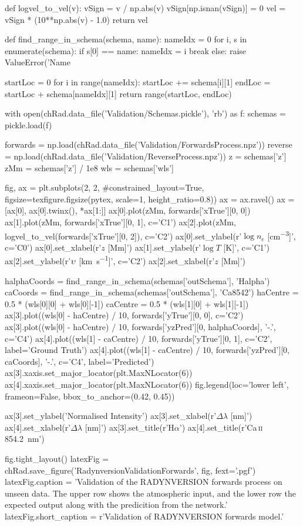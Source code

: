 \begin{pycode}[Radynversion]
def logvel_to_vel(v):
    vSign = v / np.abs(v)
    vSign[np.isnan(vSign)] = 0
    vel = vSign * (10**np.abs(v) - 1.0)
    return vel

def find_range_in_schema(schema, name):
    nameIdx = 0
    for i, s in enumerate(schema):
        if s[0] == name:
            nameIdx = i
            break
    else:
        raise ValueError('Name %

    startLoc = 0
    for i in range(nameIdx):
        startLoc += schema[i][1]
    endLoc = startLoc + schema[nameIdx][1]
    return range(startLoc, endLoc)

with open(chRad.data_file('Validation/Schemas.pickle'), 'rb') as f:
    schemas = pickle.load(f)

forwards = np.load(chRad.data_file('Validation/ForwardsProcess.npz'))
reverse = np.load(chRad.data_file('Validation/ReverseProcess.npz'))
z = schemas['z']
zMm = schemas['z'] / 1e8
wls = schemas['wls']

fig, ax = plt.subplots(2, 2, #constrained_layout=True,
                       figsize=texfigure.figsize(pytex, scale=1, height_ratio=0.8))
ax = ax.ravel()
ax = [ax[0], ax[0].twinx(), *ax[1:]]
ax[0].plot(zMm, forwards['xTrue'][0, 0])
ax[1].plot(zMm, forwards['xTrue'][0, 1], c='C1')
ax[2].plot(zMm, logvel_to_vel(forwards['xTrue'][0, 2]), c='C2')
ax[0].set_ylabel(r'$\log{n_e}$ [\si{\cm\tothe{-3}}]', c='C0')
ax[0].set_xlabel(r'$z$ [\si{\mega\metre}]')
ax[1].set_ylabel(r'$\log{T}$ [\si{\K}]', c='C1')
ax[2].set_ylabel(r'$\upsilon$ [\si{\kilo\metre\per\second}]', c='C2')
ax[2].set_xlabel(r'$z$ [\si{\mega\metre}]')


halphaCoords = find_range_in_schema(schemas['outSchema'], 'Halpha')
caCoords = find_range_in_schema(schemas['outSchema'], 'Ca8542')
haCentre = 0.5 * (wls[0][0] + wls[0][-1])
caCentre = 0.5 * (wls[1][0] + wls[1][-1])
ax[3].plot((wls[0] - haCentre) / 10, forwards['yTrue'][0, 0], c='C2')
ax[3].plot((wls[0] - haCentre) / 10, forwards['yzPred'][0, halphaCoords], '-.', c='C4')
ax[4].plot((wls[1] - caCentre) / 10, forwards['yTrue'][0, 1], c='C2', label='Ground Truth')
ax[4].plot((wls[1] - caCentre) / 10, forwards['yzPred'][0, caCoords], '-.', c='C4', label='Predicted')
ax[3].xaxis.set_major_locator(plt.MaxNLocator(6))
ax[4].xaxis.set_major_locator(plt.MaxNLocator(6))
fig.legend(loc='lower left', frameon=False, bbox_to_anchor=(0.42, 0.45))

ax[3].set_ylabel('Normalised Intensity')
ax[3].set_xlabel(r'$\Delta\lambda$ [\si{\nano\metre}]')
ax[4].set_xlabel(r'$\Delta\lambda$ [\si{\nano\metre}]')
ax[3].set_title(r'H$\alpha$')
ax[4].set_title(r'Ca\,\textsc{ii} \SI{854.2}{\nano\metre}')

fig.tight_layout()
latexFig = chRad.save_figure('RadynversionValidationForwards', fig, fext='.pgf')
latexFig.caption = 'Validation of the RADYNVERSION forwards process on unseen data. The upper row shows the atmospheric input, and the lower row the expected output along with the predicition from the network.'
latexFig.short_caption = r'Validation of RADYNVERSION forwards model.'
\end{pycode}


